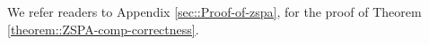 We refer readers to Appendix \ref{sec::Proof-of-zspa}, for the proof of Theorem \ref{theorem::ZSPA-comp-correctness}. 












